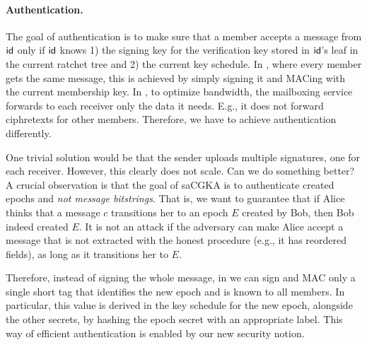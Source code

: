 \paragraph{Authentication.}
The goal of authentication is to make sure that a member accepts a message from ${\mathsf{id}}$ only if ${\mathsf{id}}$ knows 1) the signing key for the verification key stored in ${\mathsf{id}}$'s leaf in the current ratchet tree and 2) the current key schedule.
In \protITK, where every member gets the same message, this is achieved by simply signing it and MACing with the current membership key.
In \saik, to optimize bandwidth, the mailboxing service forwards to each receiver
only the data it needs. E.g., it does not forward ciphretexts for other members. Therefore, we have to achieve authentication differently.

One trivial solution would be that the sender uploads multiple signatures, one for each receiver. However, this clearly does not scale. Can we do something better?
A crucial observation is that the goal of saCGKA is to authenticate created epochs and \emph{not message
  bitstrings}. That is, we want to guarantee that if Alice thinks that a message $c$ transitions her to an epoch $E$
created by Bob, then Bob indeed created $E$. It is not an attack if the adversary can make Alice accept a message that
is not extracted with the honest procedure (e.g., it has reordered fields), as long as it transitions her to $E$.

Therefore, instead of signing the whole message, in \saik we can sign and MAC only a single short tag that identifies the new epoch and is known to all members. In particular, this value is derived in the key schedule for the new epoch, alongside the other secrets, by hashing the epoch secret with an appropriate label.
%
This way of efficient authentication is enabled by our new security notion.%



